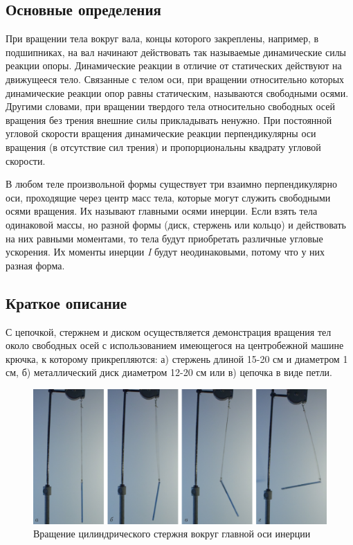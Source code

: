 \documentclass[All.tex]{subfiles}
\begin{document}
\subsection*{\textcolor{PineGreen}{Основные определения}}

%

При вращении тела вокруг вала, концы которого закреплены, например, в подшипниках, на вал начинают действовать так называемые динамические силы реакции опоры.
Динамические реакции в отличие от статических действуют на движущееся тело.
Связанные с телом оси, при вращении относительно которых динамические реакции опор равны статическим, называются свободными осями. Другими словами, при вращении твердого тела относительно свободных осей вращения без трения внешние силы прикладывать ненужно.
При постоянной угловой скорости вращения динамические реакции перпендикулярны оси вращения (в отсутствие сил трения) и пропорциональны квадрату угловой скорости.

В любом теле произвольной формы существует три взаимно перпендикулярно оси, проходящие через центр масс тела, которые могут служить свободными осями вращения.
Их называют главными осями инерции.
Если взять тела одинаковой массы, но разной формы (диск, стержень или кольцо) и действовать на них равными моментами, то тела будут приобретать различные угловые ускорения. 
Их моменты инерции \textit{I} будут неодинаковыми, потому что у них разная форма.

\subsection*{\textcolor{PineGreen}{Краткое описание}}

С цепочкой, стержнем и диском осуществляется демонстрация вращения тел около свободных осей с использованием имеющегося на центробежной машине крючка, к которому прикрепляются: а) стержень длиной 15-20 см и диаметром 1 см, б) металлический диск диаметром 12-20 см или в) цепочка в виде петли.
\begin{figure}[H] 
	\centering 		
	\includegraphics[width=0.7\linewidth]{freeaxis-2.png}
	\caption{Вращение цилиндрического стержня вокруг главной оси инерции}
	\label{freeaxis-2}
\end{figure}
\end{document}

